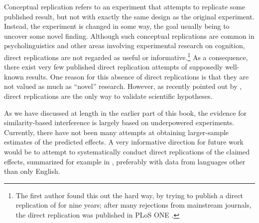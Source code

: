 \documentclass{cambridge7A}\usepackage[]{graphicx}\usepackage[]{color}
\begin{document}
Conceptual replication refers to an  experiment that attempts to replicate some published result, but not with exactly the same design as the original experiment. Instead, the experiment is changed in some way, the goal usually being to uncover some novel finding.  Although such conceptual replications are common in psycholinguistics and  other areas involving experimental research on cognition, direct replications are not regarded as useful or informative.\footnote{The first author found this out the hard way, by trying to publish a direct replication of \cite{HsiaoGibson2003} for nine years; after many rejections from mainstream journals, the direct replication was published in PLoS ONE \citep{VasishthChenLi2013}.} As a consequence, there exist very few published direct replication attempts of supposedly well-known results. One reason for this absence of direct replications is that they are not valued as much  as ``novel'' research. However, as recently pointed out by \cite{wilson2020science}, direct replications are the only way to validate scientific hypotheses.

As we have discussed at length in the earlier part of this book, the evidence for similarity-based interference is largely based on underpowered experiments. Currently, there have not been many attempts at obtaining larger-sample estimates of the predicted effects. A very informative direction for future work would be to attempt to systematically conduct direct replications of the claimed effects, summarized for example in \cite{JaegerEngelmannVasishth2017}, preferably with data from languages other than only English.
\end{document}
